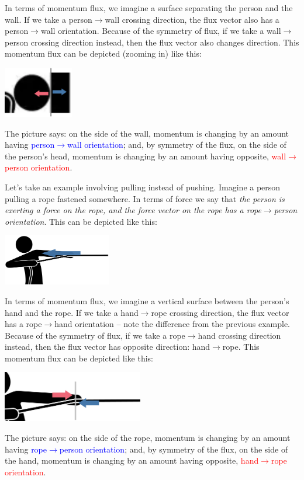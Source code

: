 \documentclass[a4paper,12pt,%
onecolumn,oneside,titlepage,%
british%
]{memoir}
\renewcommand*{\|}[1][]{\nonscript\:#1\vert\nonscript\:\mathopen{}}
\begin{document}
In terms of momentum flux, we imagine a surface separating the person and the wall. If we take a person$\rightarrow$wall crossing direction, the flux vector also has a person$\rightarrow$wall orientation. Because of the symmetry of flux, if we take a wall$\rightarrow$person crossing direction instead, then the flux vector also changes direction. This momentum flux can be depicted (zooming in) like this:\noprelistbreak
\begin{center}
  \includegraphics[height=6em]{images/person_push_flux.pdf}
\end{center}
The picture says: on the side of the wall, momentum is changing by an amount having \textcolor{blue}{person$\rightarrow$wall orientation}; and, by symmetry of the flux,  on the side of the person's head, momentum is changing by an amount having opposite, \textcolor{red}{wall$\rightarrow$person orientation}.

\medskip

Let's take an example involving pulling instead of pushing. Imagine a person pulling a rope fastened somewhere. In terms of force we say that
\emph{the person is exerting a force on the rope,
  and the force vector on the rope has a rope$\rightarrow$person orientation}. This can be depicted like this:\noprelistbreak
\begin{center}
    \includegraphics[height=6em]{images/person_pull_force.pdf}
\end{center}

In terms of momentum flux, we imagine a vertical surface between the person's hand and the rope. If we take a hand$\rightarrow$rope crossing direction, the flux vector has a rope$\rightarrow$hand orientation -- note the difference from the previous example. Because of the symmetry of flux, if we take a rope$\rightarrow$hand crossing direction instead, then the flux vector has opposite direction: hand$\rightarrow$rope. This momentum flux can be depicted like this:\noprelistbreak
\begin{center}
  \includegraphics[height=6em]{images/person_pull_flux.pdf}
\end{center}
The picture says: on the side of the rope, momentum is changing by an amount having \textcolor{blue}{rope$\rightarrow$person orientation}; and, by symmetry of the flux,  on the side of the hand, momentum is changing by an amount having opposite, \textcolor{red}{hand$\rightarrow$rope orientation}.
\end{document}
